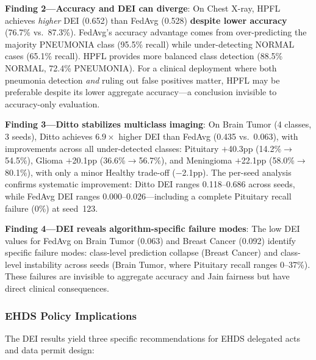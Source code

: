\documentclass[conference,a4paper]{IEEEtran}
\begin{document}
\textbf{Finding 2---Accuracy and DEI can diverge}: On Chest X-ray, HPFL achieves \textit{higher} DEI (0.652) than FedAvg (0.528) \textbf{despite lower accuracy} (76.7\% vs.\ 87.3\%). FedAvg's accuracy advantage comes from over-predicting the majority PNEUMONIA class (95.5\% recall) while under-detecting NORMAL cases (65.1\% recall). HPFL provides more balanced class detection (88.5\% NORMAL, 72.4\% PNEUMONIA). For a clinical deployment where both pneumonia detection \textit{and} ruling out false positives matter, HPFL may be preferable despite its lower aggregate accuracy---a conclusion invisible to accuracy-only evaluation.

\textbf{Finding 3---Ditto stabilizes multiclass imaging}: On Brain Tumor (4 classes, 3 seeds), Ditto achieves $6.9\times$ higher DEI than FedAvg (0.435 vs.\ 0.063), with improvements across all under-detected classes: Pituitary $+$40.3pp (14.2\%$\to$54.5\%), Glioma $+$20.1pp (36.6\%$\to$56.7\%), and Meningioma $+$22.1pp (58.0\%$\to$80.1\%), with only a minor Healthy trade-off ($-$2.1pp). The per-seed analysis confirms systematic improvement: Ditto DEI ranges 0.118--0.686 across seeds, while FedAvg DEI ranges 0.000--0.026---including a complete Pituitary recall failure (0\%) at seed~123.

\textbf{Finding 4---DEI reveals algorithm-specific failure modes}: The low DEI values for FedAvg on Brain Tumor (0.063) and Breast Cancer (0.092) identify specific failure modes: class-level prediction collapse (Breast Cancer) and class-level instability across seeds (Brain Tumor, where Pituitary recall ranges 0--37\%). These failures are invisible to aggregate accuracy and Jain fairness but have direct clinical consequences.

\subsubsection{EHDS Policy Implications}

The DEI results yield three specific recommendations for EHDS delegated acts and data permit design:
\end{document}
